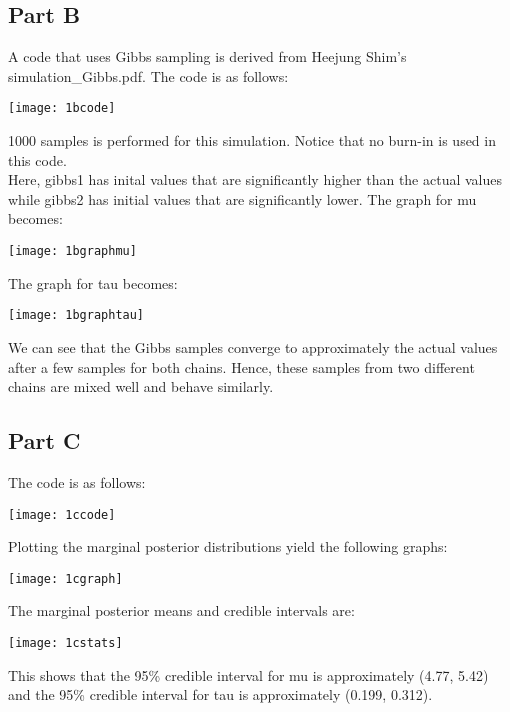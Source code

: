 \documentclass{article}
\begin{document}
\subsection{Part B}
A code that uses Gibbs sampling is derived from Heejung Shim's simulation\_Gibbs.pdf. The code is as follows:\\
\begin{center}
\texttt{[image: 1bcode]}\\
\end{center}
1000 samples is performed for this simulation. Notice that no burn-in is used in this code.\\
Here, gibbs1 has inital values that are significantly higher than the actual values while gibbs2 has initial values that are significantly lower. The graph for mu becomes:\\
\begin{center}
\texttt{[image: 1bgraphmu]}\\
\end{center}
The graph for tau becomes:\\
\begin{center}
\texttt{[image: 1bgraphtau]}\\
\end{center}
We can see that the Gibbs samples converge to approximately the actual values after a few samples for both chains. Hence, these samples from two different chains are mixed well and behave similarly.

\subsection{Part C}
The code is as follows:\\
\begin{center}
\texttt{[image: 1ccode]}
\end{center}
Plotting the marginal posterior distributions yield the following graphs:\\
\begin{center}
\texttt{[image: 1cgraph]}
\end{center}
The marginal posterior means and credible intervals are:\\
\begin{center}
\texttt{[image: 1cstats]}
\end{center}
This shows that the 95\% credible interval for mu is approximately (4.77, 5.42) and the 95\% credible interval for tau is approximately (0.199, 0.312).\\
\end{document}
